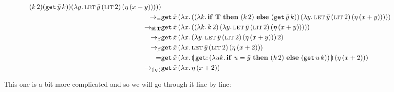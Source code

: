\begin{align*}
{{{{                                     {(\ap{k}{2})}{(\app{\op{get}}{\bar{y}}{k})}})}
                    {(\lam{y}{\appp{\lete}{\bar{y}}{\litec{2}}{(\ap{\eta}{(x + y)})}})})})} \\
\to_= &
  \app{\op{get}}{\bar{x}}
     {(\lam{x}{(\ap{(\lam{k}{\ifte{\true}
                                     {(\ap{k}{2})}{(\app{\op{get}}{\bar{y}}{k})}})}
                    {(\lam{y}{\appp{\lete}{\bar{y}}{\litec{2}}{(\ap{\eta}{(x + y)})}})})})} \\
\to_{\textbf{if}.\true} &
  \app{\op{get}}{\bar{x}}
     {(\lam{x}{(\ap{(\lam{k}{\ap{k}{2}})}
                   {(\lam{y}{\appp{\lete}{\bar{y}}{\litec{2}}{(\ap{\eta}{(x + y)})}})})})} \\
\to_{\beta} &
  \app{\op{get}}{\bar{x}}
     {(\lam{x}{\ap{(\lam{y}{\appp{\lete}{\bar{y}}{\litec{2}}{(\ap{\eta}{(x + y)})}})}
                  {2}})} \\
\to_{\beta} &
  \app{\op{get}}{\bar{x}}
     {(\lam{x}{\appp{\lete}{\bar{y}}{\litec{2}}{(\ap{\eta}{(x + 2)})}})} \\
= &
  \app{\op{get}}{\bar{x}}
     {(\lam{x}{\ap{\banana{\onto{\op{get}}{(\lam{u k}{\ifte{u = \bar{y}}
                                          {(\ap{k}{2})}{(\app{\op{get}}{u}{k})}})}}}
                  {(\ap{\eta}{(x + 2)})}})} \\
\to_{\banana{\eta}} & \app{\op{get}}{\bar{x}} {(\lam{x}{\ap{\eta}{(x + 2)}})} \\
\end{align*}

This one is a bit more complicated and so we will go through it line by
line:


